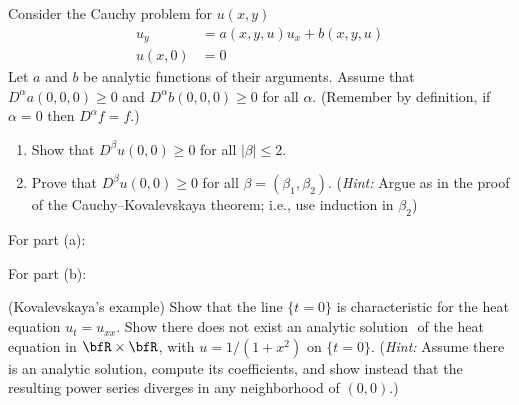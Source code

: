 \begin{problem}
  Consider the Cauchy problem for \(u(x,y)\)
  \begin{align*}
    u_y&=a(x, y, u)u_x+b(x,y,u)\\
    u(x,0)&=0
  \end{align*}
  Let \(a\) and \(b\) be analytic functions of their arguments. Assume that
  \(D^\alpha a(0,0,0)\geq 0\) and \(D^\alpha b(0,0,0)\geq 0\) for all
  \(\alpha\). (Remember by definition, if \(\alpha=0\) then
  \(D^\alpha f=f\).)
  \begin{enumerate}[label=(\alph*),noitemsep]
  \item Show that \(D^\beta u(0,0)\geq 0\) for all \(|\beta|\leq 2\).
  \item Prove that \(D^\beta u(0,0)\geq 0\) for all
    \(\beta=(\beta_1,\beta_2)\). (\emph{Hint:} Argue as in the proof of the
    Cauchy--Kovalevskaya theorem; i.e., use induction in \(\beta_2\))
  \end{enumerate}
\end{problem}
\begin{solution}
  For part (a):

  For part (b):
\end{solution}
\newpage

\begin{problem}
  (Kovalevskaya's example) Show that the line \(\{t=0\}\) is characteristic
  for the heat equation \(u_t=u_{xx}\). Show there does not exist an
  analytic solution \(\) of the heat equation in \(\bfR\times\bfR\), with
  \(u=1/(1+x^2)\) on \(\{t=0\}\). (\emph{Hint:} Assume there is an analytic
  solution, compute its coefficients, and show instead that the resulting
  power series diverges in any neighborhood of \((0,0)\).)
\end{problem}
\begin{solution}
\end{solution}

